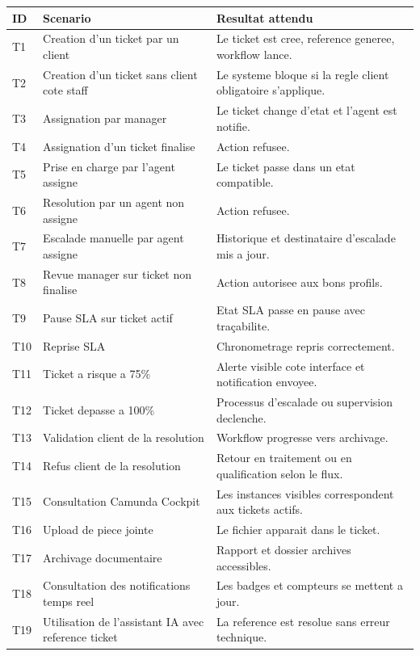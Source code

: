 \documentclass[12pt,a4paper,oneside]{report}
\begin{document}
\begin{longtable}{>{\raggedright\arraybackslash}p{1.2cm} >{\raggedright\arraybackslash}p{4.2cm} >{\raggedright\arraybackslash}p{7.6cm}}
\toprule
ID & Scenario & Resultat attendu \\
\midrule
T1 & Creation d'un ticket par un client & Le ticket est cree, reference generee, workflow lance. \\
T2 & Creation d'un ticket sans client cote staff & Le systeme bloque si la regle client obligatoire s'applique. \\
T3 & Assignation par manager & Le ticket change d'etat et l'agent est notifie. \\
T4 & Assignation d'un ticket finalise & Action refusee. \\
T5 & Prise en charge par l'agent assigne & Le ticket passe dans un etat compatible. \\
T6 & Resolution par un agent non assigne & Action refusee. \\
T7 & Escalade manuelle par agent assigne & Historique et destinataire d'escalade mis a jour. \\
T8 & Revue manager sur ticket non finalise & Action autorisee aux bons profils. \\
T9 & Pause SLA sur ticket actif & Etat SLA passe en pause avec traçabilite. \\
T10 & Reprise SLA & Chronometrage repris correctement. \\
T11 & Ticket a risque a 75\% & Alerte visible cote interface et notification envoyee. \\
T12 & Ticket depasse a 100\% & Processus d'escalade ou supervision declenche. \\
T13 & Validation client de la resolution & Workflow progresse vers archivage. \\
T14 & Refus client de la resolution & Retour en traitement ou en qualification selon le flux. \\
T15 & Consultation Camunda Cockpit & Les instances visibles correspondent aux tickets actifs. \\
T16 & Upload de piece jointe & Le fichier apparait dans le ticket. \\
T17 & Archivage documentaire & Rapport et dossier archives accessibles. \\
T18 & Consultation des notifications temps reel & Les badges et compteurs se mettent a jour. \\
T19 & Utilisation de l'assistant IA avec reference ticket & La reference est resolue sans erreur technique. \\

\end{longtable}
\end{document}
